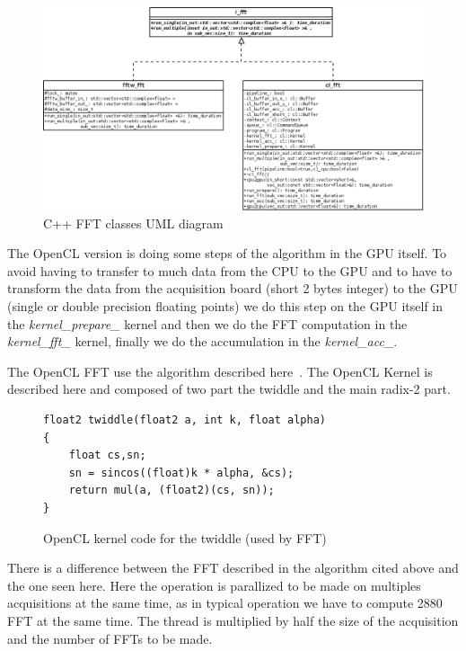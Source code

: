 \begin{figure}[H]
\centering
\caption{C++ FFT classes UML diagram}
\includegraphics[scale=0.3]{fft_uml.png}
\end{figure}

The \gls{OpenCL} version is doing some steps of the algorithm in the \gls{GPU} itself. To avoid having to transfer to much data from the CPU to the GPU and to have to transform the data from the acquisition board (short 2 bytes integer) to the \gls{GPU} (single or double precision floating points) we do this step on the \gls{GPU} itself in the \emph{kernel\_prepare\_} kernel and then we do the \gls{FFT} computation in the \emph{kernel\_fft\_} kernel, finally we do the accumulation in the \emph{kernel\_acc\_}.

The \gls{OpenCL} \gls{FFT} use the algorithm described here~\cite{Govindaraju07}. The OpenCL Kernel is described here and composed of two part the twiddle and the main radix-2 part.

\begin{figure}[H]
\centering
\caption{OpenCL kernel code for the twiddle (used by FFT)}
\label{fig:twidle_cl}
\begin{lstlisting}
float2 twiddle(float2 a, int k, float alpha)
{
	float cs,sn;
	sn = sincos((float)k * alpha, &cs);
	return mul(a, (float2)(cs, sn));
}
\end{lstlisting}
\end{figure}

There is a difference between the \gls{FFT} described in the algorithm
cited above and the one seen here. Here the operation is parallized to
be made on multiples acquisitions at the same time, as in typical
operation we have to compute 2880 FFT at the same time. The thread is
multiplied by half the size of the acquisition and the number of
\glspl{FFT} to be made.

